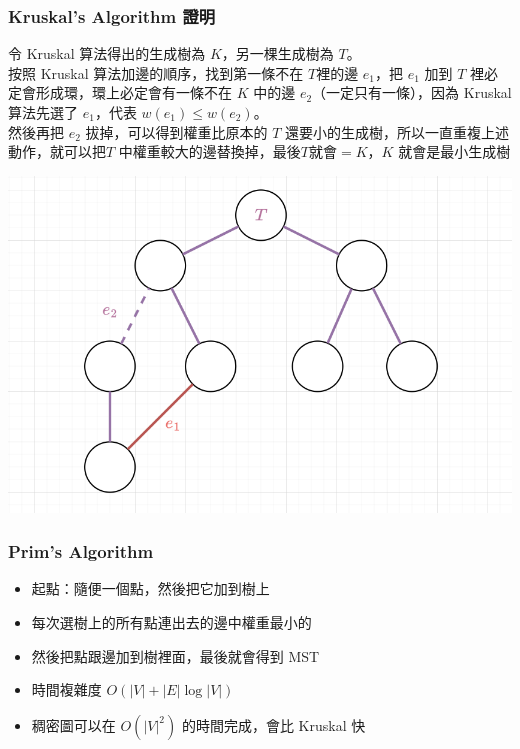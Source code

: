 \documentclass[aspectratio=169]{beamer}
\begin{document}
    \begin{frame}
        \frametitle{Kruskal's Algorithm 證明}
        令 Kruskal 算法得出的生成樹為 $K$，另一棵生成樹為 $T$。\\
        按照 Kruskal 算法加邊的順序，找到第一條不在 $T
        $裡的邊 $e_1$，把 $e_1$ 加到 $T$ 裡必定會形成環，環上必定會有一條不在 $K$ 中的邊 $e_2$（一定只有一條），因為 Kruskal 算法先選了 $e_1$，代表 $w(e_1) \leq w(e_2)$。\\
        然後再把 $e_2$ 拔掉，可以得到權重比原本的 $T$ 還要小的生成樹，所以一直重複上述動作，就可以把$T$ 中權重較大的邊替換掉，最後$T$就會$=K$，$K$ 就會是最小生成樹
        \begin{center}
            \includegraphics[scale=0.27]{images/kruskal_proof.png}
        \end{center}
    \end{frame}
    
    \begin{frame}
        \frametitle{Prim's Algorithm}
        \begin{itemize}
            \item 起點：隨便一個點，然後把它加到樹上
            \item 每次選樹上的所有點連出去的邊中權重最小的
            \item 然後把點跟邊加到樹裡面，最後就會得到 MST
            \item 時間複雜度 $O(|V|+|E| \log|V|)$
            \item 稠密圖可以在 $O(|V|^2)$ 的時間完成，會比 Kruskal 快
        \end{itemize}
    \end{frame}
    
\end{document}
